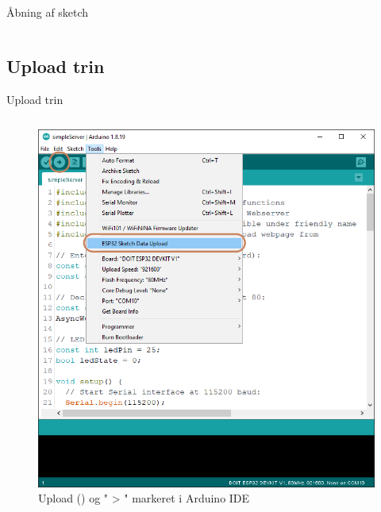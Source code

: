 \documentclass[aspectratio=169]{beamer}
\begin{document}
\begin{frame}{Åbning af sketch}
\begin{columns}
\end{columns}
\end{frame}

\subsection{Upload trin}
\begin{frame}{Upload trin}
\begin{columns}

	\begin{column}{0.5\textwidth}
		\begin{figure}
  			\includegraphics[height=0.6\textheight,keepaspectratio=true]{assets/pictures/ESP32-sketchdata-and-upload-marked.png}
  			\caption{Upload () og " > " markeret i Arduino IDE}
  			\label{fig:ESP32-sketchdata-and-upload-marked}
		\end{figure}
	\end{column}


\end{columns}
\end{frame}
\end{document}
